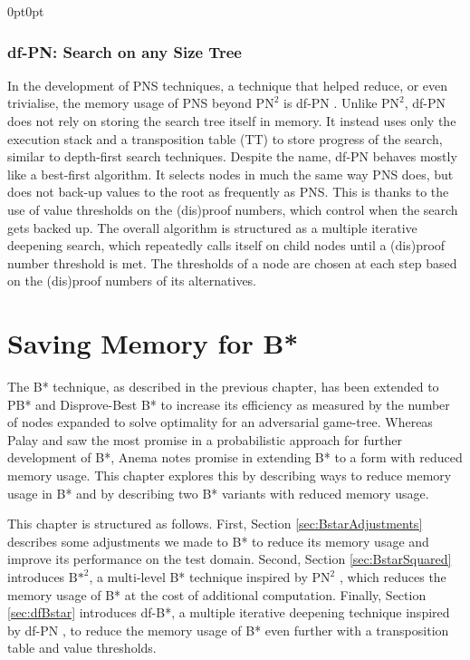 \begin{adjustwidth}{0pt}{0pt}
\subsection{df-PN: Search on any Size Tree}
\label{subsec:dfPN}
In the development of PNS techniques, a technique that helped reduce, or even trivialise, the memory usage of PNS beyond $\text{PN}^2$ \cite{Breuker1998} is df-PN \cite{Nagai2002}. Unlike ${\text{PN}^2}$, df-PN does not rely on storing the search tree itself in memory. It instead uses only the execution stack and a transposition table (TT) to store progress of the search, similar to depth-first search techniques. Despite the name, df-PN behaves mostly like a best-first algorithm. It selects nodes in much the same way PNS does, but does not back-up values to the root as frequently as PNS. This is thanks to the use of value thresholds on the (dis)proof numbers, which control when the search gets backed up. The overall algorithm is structured as a multiple iterative deepening search, which repeatedly calls itself on child nodes until a (dis)proof number threshold is met. The thresholds of a node are chosen at each step based on the (dis)proof numbers of its alternatives.
\end{adjustwidth}
\endgroup

\chapter{Saving Memory for B*}
\label{cht:SavingMemoryBstar}
The B* \cite{Berliner1979} technique, as described in the previous chapter, has been extended to PB* \cite{Palay1983} and Disprove-Best B* \cite{Anema2025} to increase its efficiency as measured by the number of nodes expanded to solve optimality for an adversarial game-tree. Whereas Palay and  saw the most promise in a probabilistic approach for further development of B*, Anema notes promise in extending B* to a form with reduced memory usage. This chapter explores this by describing ways to reduce memory usage in B* and by describing two B* variants with reduced memory usage.

This chapter is structured as follows.
First, Section \ref{sec:BstarAdjustments} describes some adjustments we made to B* to reduce its memory usage and improve its performance on the test domain.
Second, Section \ref{sec:BstarSquared} introduces ${\text{B*}}^2$, a multi-level B* technique inspired by $\text{PN}^2$ \cite{Breuker1998}, which reduces the memory usage of B* at the cost of additional computation. Finally, Section \ref{sec:dfBstar} introduces df-B*, a multiple iterative deepening technique inspired by df-PN \cite{Nagai2002}, to reduce the memory usage of B* even further with a transposition table and value thresholds.

